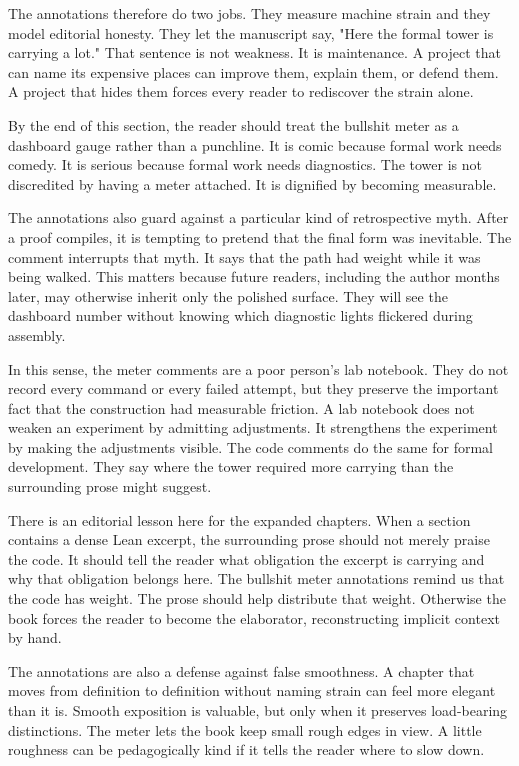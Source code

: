 The annotations therefore do two jobs. They measure machine strain and they
model editorial honesty. They let the manuscript say, "Here the formal tower
is carrying a lot." That sentence is not weakness. It is maintenance. A project
that can name its expensive places can improve them, explain them, or defend
them. A project that hides them forces every reader to rediscover the strain
alone.

By the end of this section, the reader should treat the bullshit meter as a
dashboard gauge rather than a punchline. It is comic because formal work needs
comedy. It is serious because formal work needs diagnostics. The tower is not
discredited by having a meter attached. It is dignified by becoming measurable.

The annotations also guard against a particular kind of retrospective myth.
After a proof compiles, it is tempting to pretend that the final form was
inevitable. The comment interrupts that myth. It says that the path had weight
while it was being walked. This matters because future readers, including the
author months later, may otherwise inherit only the polished surface. They will
see the dashboard number without knowing which diagnostic lights flickered
during assembly.

In this sense, the meter comments are a poor person's lab notebook. They do
not record every command or every failed attempt, but they preserve the
important fact that the construction had measurable friction. A lab notebook
does not weaken an experiment by admitting adjustments. It strengthens the
experiment by making the adjustments visible. The code comments do the same
for formal development. They say where the tower required more carrying than
the surrounding prose might suggest.

There is an editorial lesson here for the expanded chapters. When a section
contains a dense Lean excerpt, the surrounding prose should not merely praise
the code. It should tell the reader what obligation the excerpt is carrying and
why that obligation belongs here. The bullshit meter annotations remind us that
the code has weight. The prose should help distribute that weight. Otherwise
the book forces the reader to become the elaborator, reconstructing implicit
context by hand.

The annotations are also a defense against false smoothness. A chapter that
moves from definition to definition without naming strain can feel more
elegant than it is. Smooth exposition is valuable, but only when it preserves
load-bearing distinctions. The meter lets the book keep small rough edges in
view. A little roughness can be pedagogically kind if it tells the reader where
to slow down.


